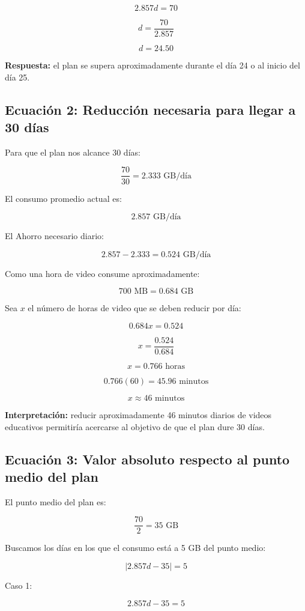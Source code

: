 \documentclass[12pt,a4paper]{article}
\begin{document}
	\[
	2.857d=70
	\]
	
	\[
	d=\frac{70}{2.857}
	\]
	
	\[
	d=24.50
	\]
	
	\textbf{Respuesta:} el plan se supera aproximadamente durante el día 24 o al inicio del día 25.
	
	\subsection{Ecuación 2: Reducción necesaria para llegar a 30 días}
	
	Para que el plan nos alcance 30 días:
	
	\[
	\frac{70}{30}=2.333\text{ GB/día}
	\]
	
	El consumo promedio actual es:
	
	\[
	2.857\text{ GB/día}
	\]
	
	El Ahorro necesario diario:
	
	\[
	2.857-2.333=0.524\text{ GB/día}
	\]
	
	Como una hora de video consume aproximadamente:
	
	\[
	700\text{ MB}=0.684\text{ GB}
	\]
	
	Sea $x$ el número de horas de video que se deben reducir por día:
	
	\[
	0.684x=0.524
	\]
	
	\[
	x=\frac{0.524}{0.684}
	\]
	
	\[
	x=0.766\text{ horas}
	\]
	
	\[
	0.766(60)=45.96\text{ minutos}
	\]
	
	\[
	\boxed{x\approx46\text{ minutos}}
	\]
	
	\textbf{Interpretación:} reducir aproximadamente 46 minutos diarios de videos educativos permitiría acercarse al objetivo de que el plan dure 30 días.
	
	\subsection{Ecuación 3: Valor absoluto respecto al punto medio del plan}
	
	El punto medio del plan es:
	
	\[
	\frac{70}{2}=35\text{ GB}
	\]
	
	Buscamos los días en los que el consumo está a 5 GB del punto medio:
	
	\[
	|2.857d-35|=5
	\]
	
	Caso 1:
	
	\[
	2.857d-35=5
	\]
	
\end{document}
